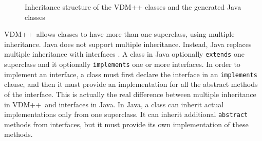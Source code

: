 \documentclass[\pformat,11pt]{article}
\newcommand{\VDM}{VDM++}
\begin{document}
\begin{figure}[H]
\begin{center}
\quad
{}
\end{center}
\caption{Inheritance structure of the VDM++ classes and the generated Java classes}\label{fig:sortppjava}

\end{figure}

\VDM\ allows classes to have more than one superclass, using multiple
inheritance. Java does not support multiple inheritance. Instead,
Java replaces multiple inheritance with interfaces \cite{Gosling&00}.
A class in Java optionally {\tt extends} one superclass and it
optionally {\tt implements} one or more interfaces. In order to
implement an interface, a class must first declare the interface in an
{\tt implements} clause, and then it must provide an implementation for
all the abstract methods of the interface. This is actually the real
difference between multiple inheritance in \VDM\ and interfaces in
Java. In Java, a class can inherit actual implementations only from
one superclass. It can inherit additional {\tt abstract} methods from
interfaces, but it must provide its own implementation of these
methods.
\end{document}
